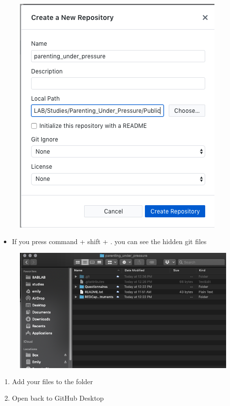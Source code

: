 \documentclass[]{book}
\providecommand{\tightlist}{%
  \setlength{\itemsep}{0pt}\setlength{\parskip}{0pt}}
\begin{document}
\begin{figure}
\centering
\includegraphics{images/research_protocols/github/4.png}
\caption{}
\end{figure}

\begin{itemize}
\tightlist
\item
  If you press command + shift + . you can see the hidden git files
\end{itemize}

\begin{figure}
\centering
\includegraphics{images/research_protocols/github/5.png}
\caption{}
\end{figure}

\begin{enumerate}
\def\labelenumi{\arabic{enumi}.}
\setcounter{enumi}{3}
\item
  Add your files to the folder
\item
  Open back to GitHub Desktop
\end{enumerate}
\end{document}
